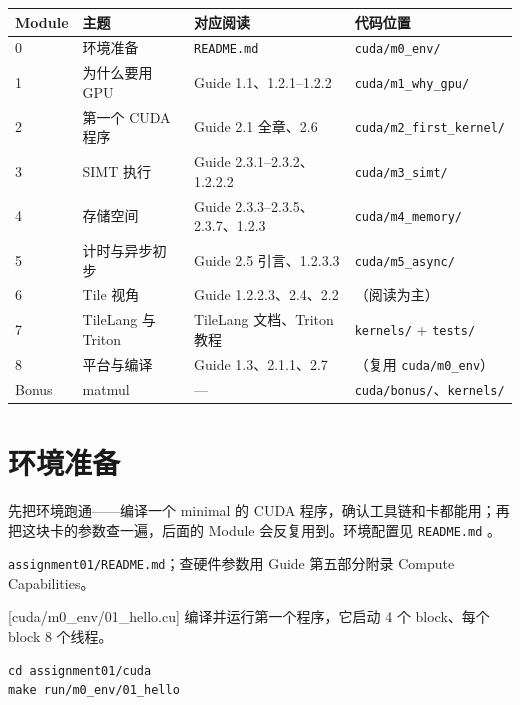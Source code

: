 \documentclass[11pt,a4paper,fontset=none]{ctexart}
\begin{document}
\begin{center}\small
\begin{tabular}{@{}llll@{}}
\toprule
Module & 主题 & 对应阅读 & 代码位置 \\
\midrule
0 & 环境准备 & \texttt{README.md} & \texttt{cuda/m0\_env/} \\
1 & 为什么要用 GPU & Guide 1.1、1.2.1--1.2.2 & \texttt{cuda/m1\_why\_gpu/} \\
2 & 第一个 CUDA 程序 & Guide 2.1 全章、2.6 & \texttt{cuda/m2\_first\_kernel/} \\
3 & SIMT 执行 & Guide 2.3.1--2.3.2、1.2.2.2 & \texttt{cuda/m3\_simt/} \\
4 & 存储空间 & Guide 2.3.3--2.3.5、2.3.7、1.2.3 & \texttt{cuda/m4\_memory/} \\
5 & 计时与异步初步 & Guide 2.5 引言、1.2.3.3 & \texttt{cuda/m5\_async/} \\
6 & Tile 视角 & Guide 1.2.2.3、2.4、2.2 & （阅读为主） \\
7 & TileLang 与 Triton & TileLang 文档、Triton 教程 & \texttt{kernels/} + \texttt{tests/} \\
8 & 平台与编译 & Guide 1.3、2.1.1、2.7 & （复用 \texttt{cuda/m0\_env}） \\
Bonus & matmul & — & \texttt{cuda/bonus/}、\texttt{kernels/} \\
\bottomrule
\end{tabular}
\end{center}

\setcounter{section}{-1}

\section{环境准备}

先把环境跑通——编译一个 minimal 的 CUDA 程序，确认工具链和卡都能用；再把这块卡的参数查一遍，后面的 Module 会反复用到。环境配置见 \texttt{README.md} 。

\begin{reading}
\texttt{assignment01/README.md}；查硬件参数用 Guide 第五部分附录 Compute Capabilities。
\end{reading}

[cuda/m0\_env/01\_hello.cu]
编译并运行第一个程序，它启动 4 个 block、每个 block 8 个线程。

\begin{lstlisting}
cd assignment01/cuda
make run/m0_env/01_hello
\end{lstlisting}
\end{document}
